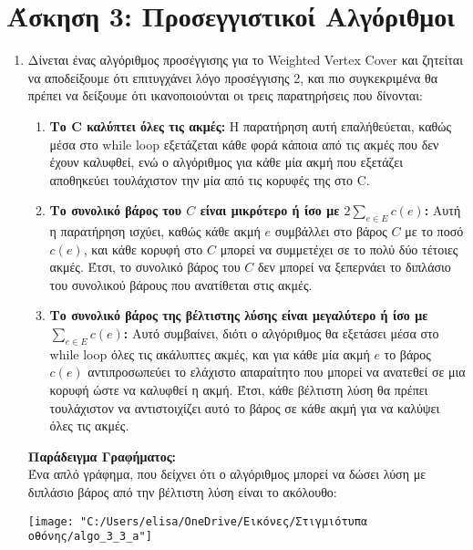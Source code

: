 \documentclass{article}
\begin{document}
\section*{\large Άσκηση 3: Προσεγγιστικοί Αλγόριθμοι}
\begin{enumerate}[label=(\alph*)]
\item Δίνεται ένας αλγόριθμος προσέγγισης για το Weighted Vertex Cover και ζητείται να αποδείξουμε ότι επιτυγχάνει λόγο προσέγγισης 2, και πιο συγκεκριμένα θα πρέπει να δείξουμε ότι ικανοποιούνται οι τρεις παρατηρήσεις που δίνονται: 
\begin{enumerate}[label=\arabic*]
\item \textbf{Το C καλύπτει όλες τις ακμές:} Η παρατήρηση αυτή επαλήθεύεται, καθώς μέσα στο while loop εξετάζεται κάθε φορά κάποια από τις ακμές που δεν έχουν καλυφθεί, ενώ ο αλγόριθμος για κάθε μία ακμή που εξετάζει αποθηκεύει τουλάχιστον την μία από τις κορυφές της στο C. 
\item \textbf{Το συνολικό βάρος του $C$ είναι μικρότερο ή ίσο με $2\sum_{e \in E}c(e)$:} Αυτή η παρατήρηση ισχύει, καθώς κάθε ακμή $e$ συμβάλλει στο βάρος $C$ με το ποσό $c(e)$, και κάθε κορυφή στο $C$ μπορεί να συμμετέχει σε το πολύ δύο τέτοιες ακμές. Έτσι, το συνολικό βάρος του $C$ δεν μπορεί να ξεπερνάει το διπλάσιο του συνολικού βάρους που ανατίθεται στις ακμές. 
\item \textbf{Το συνολικό βάρος της βέλτιστης λύσης είναι μεγαλύτερο ή ίσο με $\sum_{e\in E} c(e)$:} Αυτό συμβαίνει, διότι ο αλγόριθμος θα εξετάσει μέσα στο while loop όλες τις ακάλυπτες ακμές, και για κάθε μία ακμή $e$ το βάρος $c(e)$ αντιπροσωπεύει το ελάχιστο απαραίτητο που μπορεί να ανατεθεί σε μια κορυφή ώστε να καλυφθεί η ακμή. Έτσι, κάθε βέλτιστη λύση θα πρέπει τουλάχιστον να αντιστοιχίζει αυτό το βάρος σε κάθε ακμή για να καλύψει όλες τις ακμές. 
\end{enumerate}
\textbf{Παράδειγμα Γραφήματος:} \\
Ένα απλό γράφημα, που δείχνει ότι ο αλγόριθμος μπορεί να δώσει λύση με διπλάσιο βάρος από την βέλτιστη λύση είναι το ακόλουθο: \\
\begin{minipage}{\textwidth}
 \centering
 \texttt{[image: "C:/Users/elisa/OneDrive/Εικόνες/Στιγμιότυπα οθόνης/algo\_3\_3\_a"]}
\end{minipage}


\end{enumerate}
\end{document}
